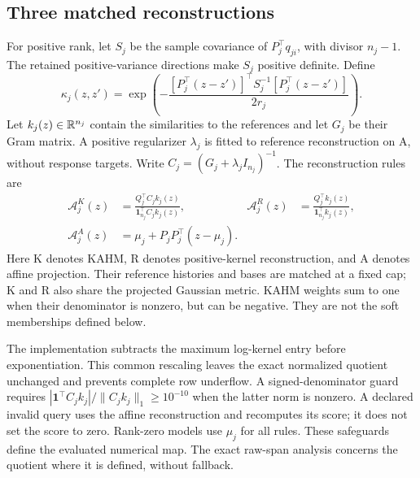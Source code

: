 \subsection{Three matched reconstructions}
For positive rank, let $S_j$ be the sample covariance of $P_j^\top q_{ji}$, with divisor $n_j-1$. The retained positive-variance directions make $S_j$ positive definite. Define
\begin{equation}
\kappa_j(z,z')=\exp\left(-\frac{[P_j^\top(z-z')]^\top S_j^{-1}[P_j^\top(z-z')]}{2r_j}\right).
\label{eq:kernel}
\end{equation}
Let $k_j(z)\in\mathbb R^{n_j}$ contain the similarities to the references and let $G_j$ be their Gram matrix. A positive regularizer $\lambda_j$ is fitted to reference reconstruction on A, without response targets. Write $C_j=(G_j+\lambda_j I_{n_j})^{-1}$. The reconstruction rules are
\begin{align}
\mathcal A^K_j(z)&=\frac{Q_j^\top C_jk_j(z)}{\mathbf1_{n_j}^\top C_jk_j(z)},&
\mathcal A^R_j(z)&=\frac{Q_j^\top k_j(z)}{\mathbf1_{n_j}^\top k_j(z)},\label{eq:reconstructions}\\
\mathcal A^A_j(z)&=\mu_j+P_jP_j^\top(z-\mu_j).\nonumber
\end{align}
Here K denotes KAHM, R denotes positive-kernel reconstruction, and A denotes affine projection. Their reference histories and bases are matched at a fixed cap; K and R also share the projected Gaussian metric. KAHM weights sum to one when their denominator is nonzero, but can be negative. They are not the soft memberships defined below.

The implementation subtracts the maximum log-kernel entry before exponentiation. This common rescaling leaves the exact normalized quotient unchanged and prevents complete row underflow. A signed-denominator guard requires $|\mathbf1^\top C_jk_j|/\|C_jk_j\|_1\geq10^{-10}$ when the latter norm is nonzero. A declared invalid query uses the affine reconstruction and recomputes its score; it does not set the score to zero. Rank-zero models use $\mu_j$ for all rules. These safeguards define the evaluated numerical map. The exact raw-span analysis concerns the quotient where it is defined, without fallback.

